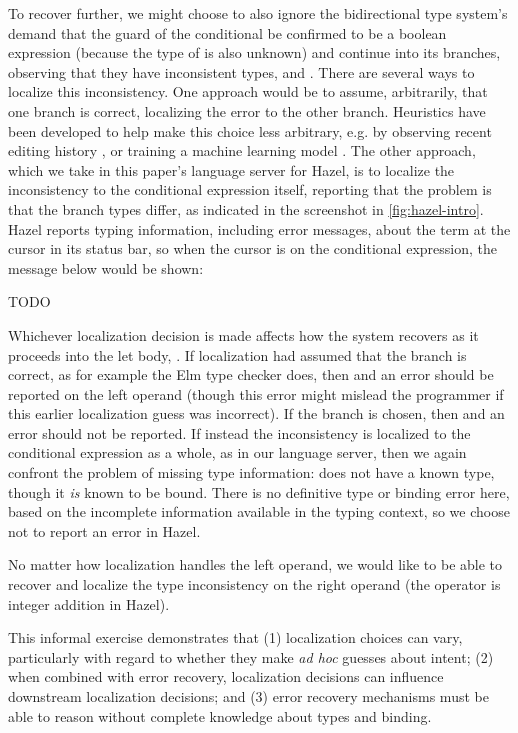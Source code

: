 To recover further, we might choose to also ignore the bidirectional type system's demand that the guard of the conditional be confirmed to be a boolean expression 
(because the type of  is also unknown) 
and continue into its branches, observing that they have inconsistent types,  and . 
There are several ways to localize this inconsistency. 
One approach would be to assume, arbitrarily, that one branch is correct, localizing the error to the other branch. 
Heuristics have been developed to help make this choice less arbitrary, e.g. 
by observing recent editing history , 
or training a machine learning model . 
The other approach, which we take in this paper's language server for Hazel, is to localize the inconsistency to the conditional expression itself, reporting that the problem is that the branch types differ, as indicated in
the screenshot in \autoref{fig:hazel-intro}. Hazel reports typing information, including error messages, about the term at the cursor in its status bar, so when the cursor is on the conditional expression, the message below would be shown:

TODO

Whichever localization decision is made affects how the system recovers as it proceeds into the let body, . 
If localization had assumed that the  branch is correct, as for example the Elm type checker does, then  and an error should be reported on the left operand (though this error might mislead the programmer if this earlier localization guess was incorrect).
If the  branch is chosen, then  and an error should not be reported. 
If instead the inconsistency is localized to the conditional expression as a whole, as in our language server, then we again confront the problem of missing type information: 
 does not have a known type,
though it \emph{is} known to be bound. 
There is no definitive type or binding error here, based on the incomplete information available in the typing context, 
so we choose not to report an error in Hazel.

No matter how localization handles the left operand, we would like to be able to recover and 
localize the type inconsistency on the right operand (the \li{+} operator is integer addition in Hazel).

This informal exercise demonstrates that (1) localization choices can vary, particularly with regard to whether they make \emph{ad hoc} guesses about intent;  
(2) when combined with error recovery, localization decisions can influence downstream localization decisions; and 
(3) error recovery mechanisms must be able to reason without complete knowledge about types and binding. 

